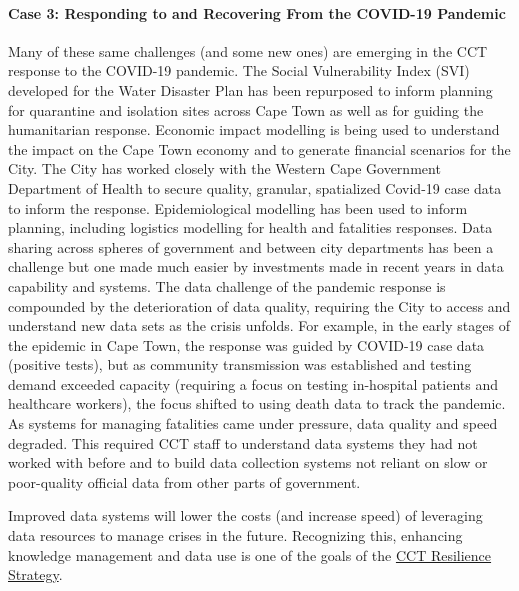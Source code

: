 \documentclass[
]{WileySix}
\begin{document}
\hypertarget{case-3-responding-to-and-recovering-from-the-covid-19-pandemic}{%
\paragraph{Case 3: Responding to and Recovering From the COVID-19 Pandemic}\label{case-3-responding-to-and-recovering-from-the-covid-19-pandemic}}

Many of these same challenges (and some new ones) are emerging in the CCT response to the COVID-19 pandemic. The Social Vulnerability Index (SVI) developed for the Water Disaster Plan has been repurposed to inform planning for quarantine and isolation sites across Cape Town as well as for guiding the humanitarian response. Economic impact modelling is being used to understand the impact on the Cape Town economy and to generate financial scenarios for the City. The City has worked closely with the Western Cape Government Department of Health to secure quality, granular, spatialized Covid-19 case data to inform the response. Epidemiological modelling has been used to inform planning, including logistics modelling for health and fatalities responses. Data sharing across spheres of government and between city departments has been a challenge but one made much easier by investments made in recent years in data capability and systems. The data challenge of the pandemic response is compounded by the deterioration of data quality, requiring the City to access and understand new data sets as the crisis unfolds. For example, in the early stages of the epidemic in Cape Town, the response was guided by COVID-19 case data (positive tests), but as community transmission was established and testing demand exceeded capacity (requiring a focus on testing in-hospital patients and healthcare workers), the focus shifted to using death data to track the pandemic. As systems for managing fatalities came under pressure, data quality and speed degraded. This required CCT staff to understand data systems they had not worked with before and to build data collection systems not reliant on slow or poor-quality official data from other parts of government.

Improved data systems will lower the costs (and increase speed) of leveraging data resources to manage crises in the future. Recognizing this, enhancing knowledge management and data use is one of the goals of the \href{https://resource.capetown.gov.za/documentcentre/Documents/City\%20strategies\%2C\%20plans\%20and\%20frameworks/Resilience_Strategy.pdf}{CCT Resilience Strategy}.
\end{document}
